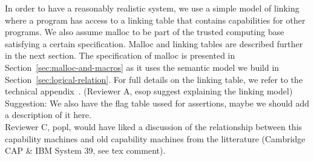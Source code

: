 \documentclass[format=acmsmall, review=false, screen=true]{acmart}
\renewcommand{\sectionname}{Section}
\newcommand{\itoplas}[1]
    {{\color{OliveGreen} #1}}
\newcommand{\itoplassug}[1]
    {{\color{Blue} #1}}
\begin{document}

In order to have a reasonably realistic system, we use a simple model of linking
where a program has access to a linking table that contains capabilities for
other programs. We also assume malloc to be part of the trusted computing base
satisfying a certain specification. Malloc and linking tables are described
further in the next section.
\itoplas{The specification of malloc is presented in \sectionname~\ref{sec:malloc-and-macros} as it uses the semantic model we build in Section~\ref{sec:logical-relation}.
For full details on the linking table, we refer to the technical
appendix~\citep{technical_appendix}.} \itoplas{(Reviewer A, esop suggest explaining the
  linking model)\\}
\itoplassug{Suggestion: We also have the flag table ussed
  for assertions, maybe we should add a description of it here.\\}
\itoplassug{Reviewer C, popl, would have liked a discussion of the relationship
  between this capability machines and old capability machines from the
  litterature (Cambridge CAP \& IBM System 39, see tex comment).\\}
\end{document}
